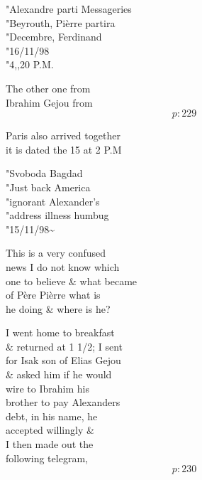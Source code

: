 \documentclass{report}
\begin{document}
	\par{
 	"Alexandre parti Messageries\ \\"Beyrouth, Pièrre partira\ \\"Decembre, Ferdinand\ \\"16/11/98\ \\"4,,20 P.M.\ \\
	}

	\par{
 	The other one from\ \\Ibrahim Gejou from\ \\
  \[p: 229 \]

	}



	\par{
 	Paris also arrived together\ \\it is dated the 15 at 2 P.M\ \\
	}

	\par{
 	"Svoboda Bagdad\ \\"Just back America\ \\"ignorant Alexander's\ \\"address illness humbug\ \\"15/11/98\~{}\ \\
	}

	\par{
 	This is a very confused\ \\news I do not know which\ \\one to believe \& what became\ \\of Père Pièrre what is\ \\he doing \& where is he?\ \\
	}

	\par{
 	I went home to breakfast\ \\\& returned at 1 1/2; I sent\ \\for Isak son of Elias Gejou\ \\\& asked him if he would\ \\wire to Ibrahim his\ \\brother to pay Alexanders\ \\debt, in his name, he\ \\accepted willingly \&\ \\I then made out the\ \\following telegram,\ \\
  \[p: 230 \]

	}
\end{document}
